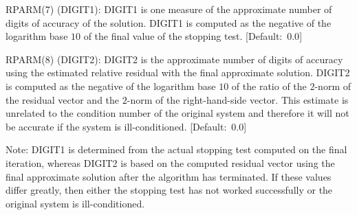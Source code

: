 \begin{list}{}{
               \leftmargin 1.00in \rightmargin 0.25in}
\item[RPARM(7) \hfill](DIGIT1):
         DIGIT1 is one measure of the approximate number of digits
         of accuracy of the solution.  DIGIT1 is computed as the
         negative of the logarithm base $10$ of the final value
         of the stopping test. \mbox{[Default: $0.0$]}
 
\item[RPARM(8) \hfill](DIGIT2):
         DIGIT2 is the approximate number of digits of accuracy
         using the estimated relative residual with the final
         approximate solution.  DIGIT2 is computed as the negative
         of the logarithm base $10$ of the ratio of the $2$-norm
         of the residual vector and the $2$-norm of the right-hand-side
         vector.  This estimate is unrelated to the condition
         number of the original system and therefore it will not
         be accurate if the system is ill-conditioned. 
         \mbox{[Default: $0.0$]}
 
         Note:  DIGIT1 is determined from the actual stopping test
         computed on the final iteration, whereas DIGIT2 is based
         on the computed residual vector using the final approximate
         solution after the algorithm has terminated.  If these
         values differ greatly, then either the stopping test has
         not worked successfully or the original system is
         ill-conditioned.
 

\end{list}
